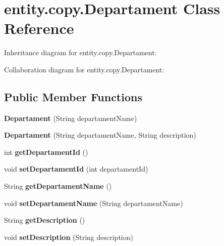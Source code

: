 \hypertarget{classentity_1_1copy_1_1_departament}{}\section{entity.\+copy.\+Departament Class Reference}
\label{classentity_1_1copy_1_1_departament}


Inheritance diagram for entity.\+copy.\+Departament\+:


Collaboration diagram for entity.\+copy.\+Departament\+:
\subsection*{Public Member Functions}
\begin{DoxyCompactItemize}
\item 
\mbox{\label{classentity_1_1copy_1_1_departament_aab6d5b391b0ea8672c4dae7bc954ba1a}} 
{\bfseries Departament} (String departament\+Name)
\item 
\mbox{\label{classentity_1_1copy_1_1_departament_aab50d4211d1c44c5f017975cf93dc92b}} 
{\bfseries Departament} (String departament\+Name, String description)
\item 
\mbox{\label{classentity_1_1copy_1_1_departament_a3c7449b703e959fc71d8c0ecd331f907}} 
int {\bfseries get\+Departament\+Id} ()
\item 
\mbox{\label{classentity_1_1copy_1_1_departament_ad4e0e567472cfc50b14f09922a9c6ea7}} 
void {\bfseries set\+Departament\+Id} (int departament\+Id)
\item 
\mbox{\label{classentity_1_1copy_1_1_departament_a4959ef713e209f19ffd5f847fbeedf5e}} 
String {\bfseries get\+Departament\+Name} ()
\item 
\mbox{\label{classentity_1_1copy_1_1_departament_a397c622494413a4383012028d79ce6b6}} 
void {\bfseries set\+Departament\+Name} (String departament\+Name)
\item 
\mbox{\label{classentity_1_1copy_1_1_departament_a2f87bbf4875d6c04fa6a6fd087a148f3}} 
String {\bfseries get\+Description} ()
\item 
\mbox{\label{classentity_1_1copy_1_1_departament_af9028874c357ea724c5e013a7c1a06b3}} 
void {\bfseries set\+Description} (String description)
\end{DoxyCompactItemize}


